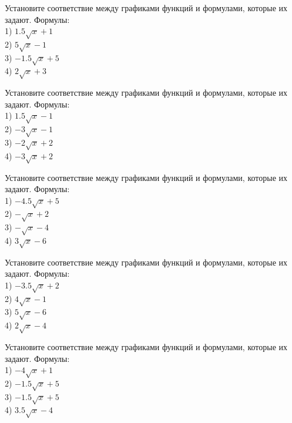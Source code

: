\documentclass[4apaper]{article}
\begin{document}
\begin{taskBN}{31}
Установите соответствие между графиками функций и формулами, которые их задают. Формулы: \\1) $1.5\sqrt{x}+1$\\2) $5\sqrt{x}-1$\\3) $-1.5\sqrt{x}+5$\\4) $2\sqrt{x}+3$
\end{taskBN}

\begin{taskBN}{32}
Установите соответствие между графиками функций и формулами, которые их задают. Формулы: \\1) $1.5\sqrt{x}-1$\\2) $-3\sqrt{x}-1$\\3) $-2\sqrt{x}+2$\\4) $-3\sqrt{x}+2$
\end{taskBN}

\begin{taskBN}{33}
Установите соответствие между графиками функций и формулами, которые их задают. Формулы: \\1) $-4.5\sqrt{x}+5$\\2) $-\sqrt{x}+2$\\3) $-\sqrt{x}-4$\\4) $3\sqrt{x}-6$
\end{taskBN}

\begin{taskBN}{34}
Установите соответствие между графиками функций и формулами, которые их задают. Формулы: \\1) $-3.5\sqrt{x}+2$\\2) $4\sqrt{x}-1$\\3) $5\sqrt{x}-6$\\4) $2\sqrt{x}-4$
\end{taskBN}

\begin{taskBN}{35}
Установите соответствие между графиками функций и формулами, которые их задают. Формулы: \\1) $-4\sqrt{x}+1$\\2) $-1.5\sqrt{x}+5$\\3) $-1.5\sqrt{x}+5$\\4) $3.5\sqrt{x}-4$
\end{taskBN}
\end{document}
